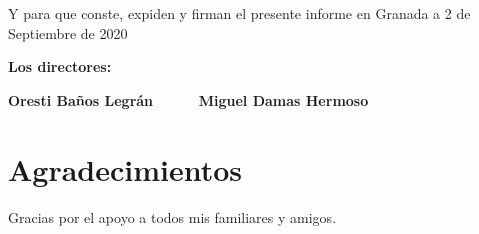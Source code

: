 Y para que conste, expiden y firman el presente informe en Granada a 2 de Septiembre de 2020

\vspace{0.3cm}

\textbf{Los directores:}

\vspace{5cm}

\noindent \textbf{Oresti Baños Legrán \ \ \ \ \ Miguel Damas Hermoso}

\chapter*{Agradecimientos}
\thispagestyle{empty}

       \vspace{1cm}


Gracias por el apoyo a todos mis familiares y amigos.

